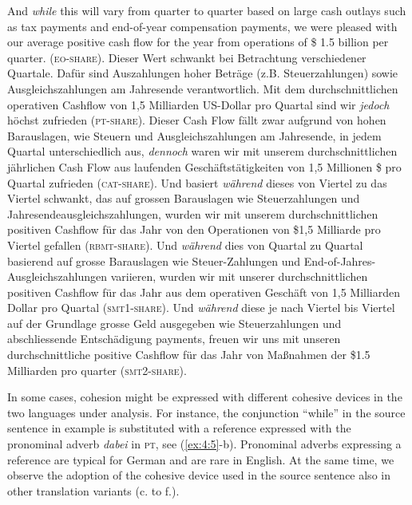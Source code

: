 \documentclass[output=paper]{LSP/langsci}
\begin{document}
\ea \label{ex:4:4}
\ea And \textit{while} this will vary from quarter to quarter based on large cash outlays such as tax payments and end-of-year compensation payments, we were pleased with our average positive cash flow for the year from operations of \$ 1.5 billion per quarter. (\textsc{eo}-\textsc{share}).
\ex Dieser Wert schwankt bei Betrachtung verschiedener Quartale. Dafür sind Auszahlungen hoher Beträge (z.B. Steuerzahlungen) sowie Ausgleichszahlungen am Jahresende verantwortlich. Mit dem durchschnittlichen operativen Cashflow von 1,5 Milliarden US-Dollar pro Quartal sind wir \textit{jedoch} höchst zufrieden (\textsc{pt}-\textsc{share}).
\ex  Dieser Cash Flow fällt zwar aufgrund von hohen Barauslagen, wie Steuern und Ausgleichszahlungen am Jahresende, in jedem Quartal unterschiedlich aus, \textit{dennoch} waren wir mit unserem durchschnittlichen jährlichen Cash Flow aus laufenden Geschäftstätigkeiten von 1,5 Millionen \$ pro Quartal zufrieden (\textsc{cat}-\textsc{share}).
\ex  Und basiert \textit{während} dieses von Viertel zu das Viertel schwankt, das auf grossen Barauslagen wie Steuerzahlungen und Jahresendeausgleichszahlungen, wurden wir mit unserem durchschnittlichen positiven Cashflow für das Jahr von den Operationen von \$1,5 Milliarde pro Viertel gefallen (\textsc{rbmt}-\textsc{share}).
\ex  Und \textit{während} dies von Quartal zu Quartal basierend auf grosse Barauslagen wie Steuer-Zahlungen und End-of-Jahres-Ausgleichszahlungen variieren, wurden wir mit unserer durchschnittlichen positiven Cashflow für das Jahr aus dem operativen Geschäft von 1,5 Milliarden Dollar pro Quartal (\textsc{smt}1-\textsc{share}).
\ex  Und \textit{während} diese je nach Viertel bis Viertel auf der Grundlage grosse Geld ausgegeben wie Steuerzahlungen und abschliessende Entschädigung payments, freuen wir uns mit unseren durchschnittliche positive Cashflow für das Jahr von Maßnahmen der \$1.5 Milliarden pro quarter (\textsc{smt}2-\textsc{share}).
\z
\z

In some cases, cohesion might be expressed with different cohesive devices in the two languages under analysis. For instance, the conjunction “while” in the source sentence in example  is substituted with a reference expressed with the pronominal adverb \textit{dabei} in \textsc{pt}, see (\ref{ex:4:5}-b). Pronominal adverbs expressing a reference are typical for German and are rare in English. At the same time, we observe the adoption of the cohesive device used in the source sentence also in other translation variants (c. to f.).
\end{document}

